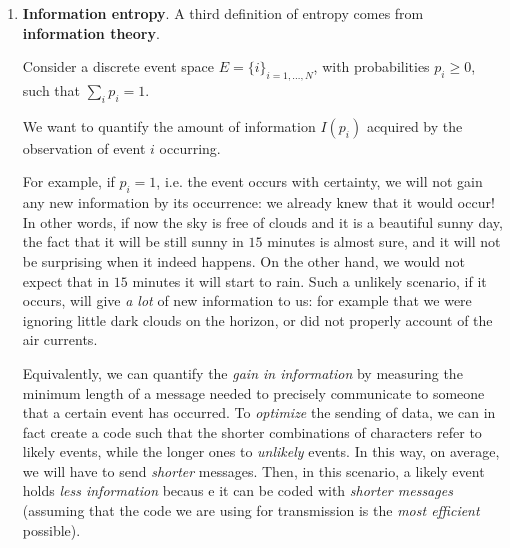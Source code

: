 \documentclass[../../main.tex]{subfiles}
\begin{document}
\begin{enumerate}
    \item \textbf{Information entropy}.  
    A third definition of entropy comes from \textbf{information theory}.

    Consider a discrete event space $E = \{i\}_{i=1,\dots, N}$, with probabilities $p_i \geq 0$, such that $\sum_i p_i = 1$.

    We want to quantify the amount of information $I(p_i)$ acquired by the observation of event $i$ occurring. 

    For example, if $p_i=1$, i.e. the event occurs with certainty, we will not gain any new information by its occurrence: we already knew that it would occur! In other words, if now the sky is free of clouds and it is a beautiful sunny day, the fact that it will be still sunny in $15$ minutes is almost sure, and it will not be surprising when it indeed happens. On the other hand, we would not expect that in $15$ minutes it will start to rain. Such a unlikely scenario, if it occurs, will give \textit{a lot} of new information to us: for example that we were ignoring little dark clouds on the horizon, or did not properly account of the air currents.  

    Equivalently, we can quantify the \textit{gain in information} by measuring the minimum length of a message needed to precisely communicate to someone that a certain event has occurred. To \textit{optimize} the sending of data, we can in fact create a code such that the shorter combinations of characters refer to likely events, while the longer ones to \textit{unlikely} events. In this way, on average, we will have to send \textit{shorter} messages. Then, in this scenario, a likely event holds \textit{less information} becaus e it can be coded with \textit{shorter messages} (assuming that the code we are using for transmission is the \textit{most efficient} possible).

    \medskip


\end{enumerate}
\end{document}
